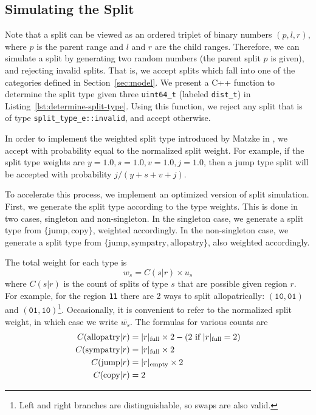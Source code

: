 \documentclass{article}
\begin{document}
\subsection{Simulating the Split}

Note that a split can be viewed as an ordered triplet of binary numbers \(
(p,l,r) \), where $p$ is the parent range and $l$ and $r$ are the child ranges.
Therefore, we can simulate a split by generating two random numbers (the parent
split $p$ is given), and rejecting invalid splits.
That is, we accept splits which fall into one of the categories defined in
Section~\ref{sec:model}.
We present a C++ function to determine the split type given three
\texttt{uint64_t} (labeled \texttt{dist_t}) in
Listing~\ref{lst:determine-split-type}.
Using this function, we reject any split that is of type
\texttt{split_type_e::invalid}, and accept otherwise.

In order to implement the weighted split type introduced by Matzke in
\cite{ModelSelectionMatzke2014}, we accept with probability equal to the
normalized split weight.
For example, if the split type weights are $y = 1.0, s = 1.0, v = 1.0, j=1.0$,
then a jump type split will be accepted with probability $j/(y + s + v +
j)$.

To accelerate this process, we implement an optimized version of split
simulation.
First, we generate the split type according to the type weights.
This is done in two cases, singleton and non-singleton.
In the singleton case, we generate a split type from $\{\text{jump},
\text{copy}\}$, weighted accordingly.
In the non-singleton case, we generate a split type from $\{\text{jump},
\text{sympatry}, \text{allopatry}\}$, also weighted accordingly.

The total weight for each type is
\begin{equation}
	w_s = C(s|r) \times u_s
\end{equation}
where $C(s|r)$ is the count of splits of type $s$ that are
possible given region $r$.
For example, for the region \texttt{11} there are 2 ways to split
allopatrically: $(\texttt{10}, \texttt{01})$ and $(\texttt{01},
\texttt{10})$\footnote{Left and right branches are distinguishable, so swaps
	are also valid.}\footnotemark.
Occasionally, it is convenient to refer to the normalized split weight, in
which case we write \( \overline{w_s} \).
The formulas for various counts are
\begin{align*}
  C(\text{allopatry}|r) & =
  |r|_\text{full} \times 2 - (2 \text{ if } |r|_\text{full} = 2) \\
  C(\text{sympatry}|r)  & = |r|_\text{full} \times 2           \\ C(\text{jump}|r) & =
  |r|_\text{empty} \times 2                                    \\ C(\text{copy}|r) & = 2 \\
\end{align*}
\end{document}
